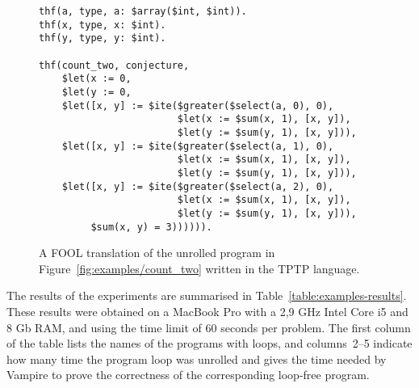 
\begin{figure}[h]
\begin{lstlisting}[language=tptp]
thf(a, type, a: $array($int, $int)).
thf(x, type, x: $int).
thf(y, type, y: $int).

thf(count_two, conjecture,
    $let(x := 0,
    $let(y := 0,
    $let([x, y] := $ite($greater($select(a, 0), 0),
                        $let(x := $sum(x, 1), [x, y]),
                        $let(y := $sum(y, 1), [x, y])),
    $let([x, y] := $ite($greater($select(a, 1), 0),
                        $let(x := $sum(x, 1), [x, y]),
                        $let(y := $sum(y, 1), [x, y])),
    $let([x, y] := $ite($greater($select(a, 2), 0),
                        $let(x := $sum(x, 1), [x, y]),
                        $let(y := $sum(y, 1), [x, y])),
         $sum(x, y) = 3)))))).
\end{lstlisting}
  \caption{A FOOL translation of the unrolled program in Figure~\ref{fig:examples/count_two} written in the TPTP language.}
  \label{fig:examples/count_two_tptp}
\end{figure}

The results of the experiments are summarised in Table~\ref{table:examples-results}. These results were obtained on a MacBook Pro with a 2,9 GHz Intel Core i5 and 8 Gb RAM, and using the time limit of 60 seconds per problem.  The first column of the table lists the
names of the programs with loops, and columns~2--5 indicate how many
time the program loop was unrolled and gives the time needed by
Vampire to prove the correctness of the corresponding loop-free
program. %

